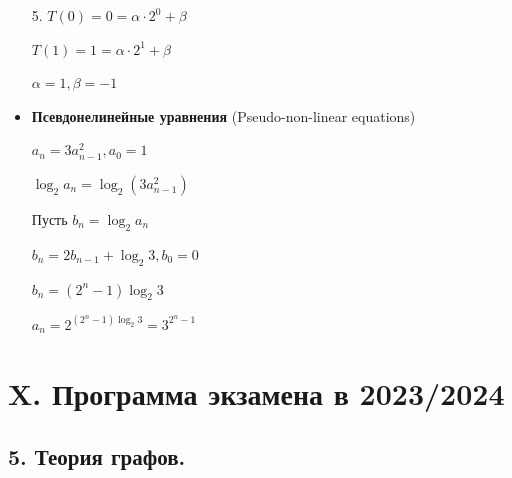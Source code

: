 \documentclass[12pt]{article}
\begin{document}
\begin{itemize}
        5. $T(0) = 0 = \alpha \cdot 2^0 + \beta$

        $T(1) = 1 = \alpha \cdot 2^1 + \beta$

        $\alpha = 1, \beta = -1$

        \vspace{5mm}

        \item \textbf{Псевдонелинейные уравнения} (Pseudo-non-linear equations)

        \Ex $a_n = 3a_{n - 1}^2, a_0 = 1$

        $\log_2 a_n = \log_2 (3a_{n - 1}^2)$

        Пусть $b_n = \log_2 a_n$

        $b_n = 2b_{n - 1} + \log_2 3, b_0 = 0$

        $b_n = (2^n - 1)\log_2 3$

        $a_n = 2^{(2^n - 1)\log_2 3} = 3^{2^n - 1}$

    \end{itemize}


    \clearpage


    \section{X. Программа экзамена в 2023/2024}


    \subsection{5. Теория графов.}
\end{document}
